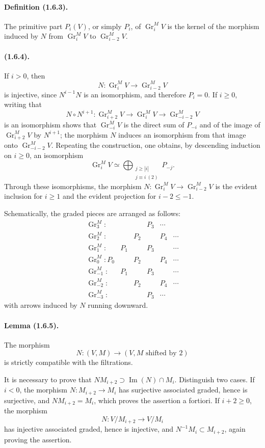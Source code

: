 \documentclass[11pt]{article}
\theoremstyle{remark}
\newcommand{\Gr}{\operatorname{Gr}}
\newcommand{\Image}{\operatorname{Im}}
\begin{document}
\paragraph{Definition (1.6.3).}
The primitive part $P_i(V)$, or simply $P_i$, of $\Gr^M_i V$ is the kernel of the morphism induced by $N$ from $\Gr^M_i V$ to $\Gr^M_{i-2}V$.

\paragraph{(1.6.4).}
If $i>0$, then
\[
N:\Gr^M_i V\longrightarrow \Gr^M_{i-2}V
\]
is injective, since $N^{i-1}N$ is an isomorphism, and therefore $P_i=0$. If $i\ge0$, writing that
\[
N\circ N^{i+1}:\Gr^M_{i+2}V\longrightarrow \Gr^M_i V\longrightarrow \Gr^M_{-i-2}V
\]
is an isomorphism shows that $\Gr^M_{-i}V$ is the direct sum of $P_{-i}$ and of the image of $\Gr^M_{i+2}V$ by $N^{i+1}$; the morphism $N$ induces an isomorphism from that image onto $\Gr^M_{-i-2}V$. Repeating the construction, one obtains, by descending induction on $i\ge0$, an isomorphism
\begin{equation}\tag{1.6.4.1}
\Gr^M_i V\simeq \bigoplus_{\substack{j\ge |i|\\ j\equiv i\ (2)}} P_{-j}.
\end{equation}
Through these isomorphisms, the morphism $N:\Gr^M_iV\to\Gr^M_{i-2}V$ is the evident inclusion for $i\ge1$ and the evident projection for $i-2\le -1$.

Schematically, the graded pieces are arranged as follows:
\[
\begin{array}{cccccc}
\Gr^M_3: &&& P_3&\cdots\\
\Gr^M_2: && P_2 && P_4&\cdots\\
\Gr^M_1: & P_1 && P_3 &&\cdots\\
\Gr^M_0: P_0&&P_2&&P_4&\cdots\\
\Gr^M_{-1}: & P_1 &&P_3&&\cdots\\
\Gr^M_{-2}: &&P_2&&P_4&\cdots\\
\Gr^M_{-3}: &&&P_3&\cdots
\end{array}
\]
with arrows induced by $N$ running downward.

\paragraph{Lemma (1.6.5).}
The morphism
\[
N:(V,M)\longrightarrow (V,M\text{ shifted by }2)
\]
is strictly compatible with the filtrations.

It is necessary to prove that $NM_{i+2}\supset \Image(N)\cap M_i$. Distinguish two cases. If $i<0$, the morphism $N:M_{i+2}\to M_i$ has surjective associated graded, hence is surjective, and $NM_{i+2}=M_i$, which proves the assertion a fortiori. If $i+2\ge0$, the morphism
\[
N:V/M_{i+2}\longrightarrow V/M_i
\]
has injective associated graded, hence is injective, and $N^{-1}M_i\subset M_{i+2}$, again proving the assertion.
\end{document}
